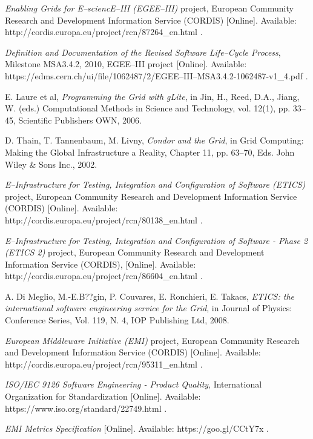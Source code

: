 \documentclass[journal]{IEEEtran}
\begin{document}
\begin{thebibliography}{1}
\emph{Enabling Grids for E--sciencE--III (EGEE--III)} project, European Community
Research and Development Information Service (CORDIS) [Online]. Available:
http://cordis.europa.eu/project/rcn/87264\_en.html .

\emph{Definition and Documentation of the Revised Software Life--Cycle Process},
Milestone MSA3.4.2, 2010, EGEE--III project [Online]. Available: https://edms.cern.ch/ui/file/1062487/2/EGEE--III--MSA3.4.2-1062487-v1\_4.pdf .

E. Laure et al, \emph{Programming the Grid with gLite}, in Jin, H., Reed, D.A.,
Jiang, W. (eds.) Computational Methods in Science and Technology, vol. 12(1),
pp. 33--45, Scientific Publishers OWN, 2006.

D. Thain, T. Tannenbaum, M. Livny, \emph{Condor and the Grid}, in Grid
Computing: Making the Global Infrastructure a Reality, Chapter 11, pp. 63--70,
Eds. John Wiley \& Sons Inc., 2002.

\emph{E--Infrastructure for Testing, Integration and Configuration of Software
(ETICS)} project, European Community Research and Development Information
Service (CORDIS) [Online]. Available: http://cordis.europa.eu/project/rcn/80138\_en.html .

\emph{E--Infrastructure for Testing, Integration and Configuration of Software -
Phase 2 (ETICS 2)} project, European Community Research and Development
Information Service (CORDIS), [Online]. Available: http://cordis.europa.eu/project/rcn/86604\_en.html .

A. Di Meglio, M.-E.B??gin, P. Couvares, E. Ronchieri, E. Takacs, \emph{ETICS:
the international software engineering service for the Grid}, in Journal of
Physics: Conference Series, Vol. 119, N. 4, IOP Publishing Ltd, 2008.

\emph{European Middleware Initiative (EMI)} project, European Community
Research and Development Information Service (CORDIS) [Online]. Available:
http://cordis.europa.eu/project/rcn/95311\_en.html .

\emph{ISO/IEC 9126 Software Engineering - Product Quality}, International
Organization for Standardization [Online]. Available: https://www.iso.org/standard/22749.html .

\emph{EMI Metrics Specification} [Online]. Available: https://goo.gl/CCtY7x .


\end{thebibliography}
\end{document}
